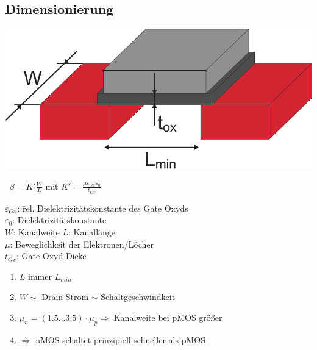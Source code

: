 \documentclass[a4paper,twocolumn,10pt]{article}
\begin{document}
\subsection*{Dimensionierung}
\begin{minipage}[b]{0.2\textwidth}
\includegraphics[width=\columnwidth]{Grafiken/Dimensionierung}
\end{minipage}
\hfill
\begin{minipage}[b]{0.3\textwidth}
$\;\;\beta=K'\frac{W}{L}$ mit $K'=\frac{\mu\varepsilon_{Ox}\varepsilon_0}{t_{Ox}}$
\end{minipage}
\begin{tabbing}
$\varepsilon_{Ox}$: \= rel. Dielektrizitätskonstante des Gate Oxyds \\
$\varepsilon_0$: \> Dielektrizitätskonstante \\
$W$: \> Kanalweite    $L$: Kanallänge \\
$\mu$: \> Beweglichkeit der Elektronen/Löcher \\
$t_{Ox}$: \> Gate Oxyd-Dicke
\end{tabbing}
\begin{enumerate}[label=,leftmargin=0mm]
	\item $L$ immer $L_{min}$
	\item $W \sim $ Drain Strom $\sim$ Schaltgeschwindkeit
	\item $\mu_n=(1.5\ldots 3.5)\cdot \mu_p \Rightarrow$ Kanalweite bei pMOS größer
	\item $\Rightarrow$ nMOS schaltet prinzipiell schneller als pMOS
\end{enumerate}
\end{document}
